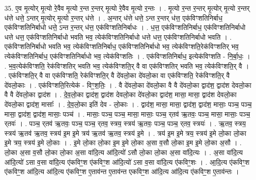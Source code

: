 \documentclass[17pt]{extarticle}
\begin{document}
35. ए॒व मृ॒त्योर् मृ॒त्यो रे॒वैव मृ॒त्यो र॒न्त र॒न्तर् मृ॒त्यो रे॒वैव मृ॒त्यो र॒न्तः । . मृ॒त्यो र॒न्त र॒न्तर् मृ॒त्योर् मृ॒त्यो र॒न्तर् ध॑त्ते धत्ते॒ ऽन्तर् मृ॒त्योर् मृ॒त्यो र॒न्तर् ध॑त्ते । . अ॒न्तर् ध॑त्ते धत्ते॒ ऽन्त र॒न्तर् ध॑त्त॒ एक॑विꣳशतिनिर्बाध॒ एक॑विꣳशतिनिर्बाधो धत्ते॒ ऽन्त र॒न्तर् ध॑त्त॒ एक॑विꣳशतिनिर्बाधः । . ध॒त्त॒ एक॑विꣳशतिनिर्बाध॒ एक॑विꣳशतिनिर्बाधो धत्ते धत्त॒ एक॑विꣳशतिनिर्बाधो भवति भव॒ त्येक॑विꣳशतिनिर्बाधो धत्ते धत्त॒ एक॑विꣳशतिनिर्बाधो भवति । . एक॑विꣳशतिनिर्बाधो भवति भव॒ त्येक॑विꣳशतिनिर्बाध॒ एक॑विꣳशतिनिर्बाधो भव॒ त्येक॑विꣳशति॒रेक॑विꣳशतिर् भव॒ त्येक॑विꣳशतिनिर्बाध॒ एक॑विꣳशतिनिर्बाधो भव॒ त्येक॑विꣳशतिः । . एक॑विꣳशतिनिर्बाध॒ इत्येक॑विꣳशति - नि॒र्बा॒धः॒ । . भ॒व॒त्येक॑विꣳशति॒ रेक॑विꣳशतिर् भवति भव॒ त्येक॑विꣳशति॒र् वै वा एक॑विꣳशतिर् भवति भव॒ त्येक॑विꣳशति॒र् वै । . एक॑विꣳशति॒र् वै वा एक॑विꣳशति॒ रेक॑विꣳशति॒र् वै दे॑वलो॒का दे॑वलो॒का वा एक॑विꣳशति॒ रेक॑विꣳशति॒र् वै दे॑वलो॒काः । . एक॑विꣳशति॒रित्येक॑ - विꣳ॒॒श॒तिः॒ । . वै दे॑वलो॒का दे॑वलो॒का वै वै दे॑वलो॒का द्वाद॑श॒ द्वाद॑श देवलो॒का वै वै दे॑वलो॒का द्वाद॑श । . दे॒व॒लो॒का द्वाद॑श॒ द्वाद॑श देवलो॒का दे॑वलो॒का द्वाद॑श॒ मासा॒ मासा॒ द्वाद॑श देवलो॒का दे॑वलो॒का द्वाद॑श॒ मासाः᳚ । . दे॒व॒लो॒का इति॑ देव - लो॒काः । . द्वाद॑श॒ मासा॒ मासा॒ द्वाद॑श॒ द्वाद॑श॒ मासाः॒ पञ्च॒ पञ्च॒ मासा॒ द्वाद॑श॒ द्वाद॑श॒ मासाः॒ पञ्च॑ । . मासाः॒ पञ्च॒ पञ्च॒ मासा॒ मासाः॒ पञ्च॒ र्‌तव॑ ऋ॒तवः॒ पञ्च॒ मासा॒ मासाः॒ पञ्च॒ र्‌तवः॑ । . पञ्च॒ र्‌तव॑ ऋ॒तवः॒ पञ्च॒ पञ्च॒ र्‌तव॒ स्त्रय॒ स्त्रय॑ ऋ॒तवः॒ पञ्च॒ पञ्च॒ र्‌तव॒ स्त्रयः॑ । . ऋ॒तव॒ स्त्रय॒ स्त्रय॑ ऋ॒तव॑ ऋ॒तव॒ स्त्रय॑ इ॒म इ॒मे त्रय॑ ऋ॒तव॑ ऋ॒तव॒ स्त्रय॑ इ॒मे । . त्रय॑ इ॒म इ॒मे त्रय॒ स्त्रय॑ इ॒मे लो॒का लो॒का इ॒मे त्रय॒ स्त्रय॑ इ॒मे लो॒काः । . इ॒मे लो॒का लो॒का इ॒म इ॒मे लो॒का अ॒सा व॒सौ लो॒का इ॒म इ॒मे लो॒का अ॒सौ । . लो॒का अ॒सा व॒सौ लो॒का लो॒का अ॒सा वा॑दि॒त्य आ॑दि॒त्यो॑ ऽसौ लो॒का लो॒का अ॒सा वा॑दि॒त्यः । . अ॒सा वा॑दि॒त्य आ॑दि॒त्यो॑ ऽसा व॒सा वा॑दि॒त्य ए॑कविꣳ॒॒श ए॑कविꣳ॒॒श आ॑दि॒त्यो॑ ऽसा व॒सा वा॑दि॒त्य ए॑कविꣳ॒॒शः । . आ॒दि॒त्य ए॑कविꣳ॒॒श ए॑कविꣳ॒॒श आ॑दि॒त्य आ॑दि॒त्य ए॑कविꣳ॒॒श ए॒ताव॑न्त ए॒ताव॑न्त एकविꣳ॒॒श आ॑दि॒त्य आ॑दि॒त्य ए॑कविꣳ॒॒श ए॒ताव॑न्तः । \newline
\pagebreak
{}
\end{document}
